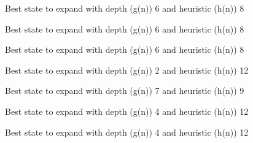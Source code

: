 \documentclass{article}
\begin{document}
{\noindent Best state to expand with depth (g(n)) 6 and heuristic (h(n)) 8\newline}
{}\newline

{\noindent Best state to expand with depth (g(n)) 6 and heuristic (h(n)) 8\newline}
{}\newline

{\noindent Best state to expand with depth (g(n)) 6 and heuristic (h(n)) 8\newline}
{}\newline

{\noindent Best state to expand with depth (g(n)) 2 and heuristic (h(n)) 12\newline}
{}\newline

{\noindent Best state to expand with depth (g(n)) 7 and heuristic (h(n)) 9\newline}
{}\newline

{\noindent Best state to expand with depth (g(n)) 4 and heuristic (h(n)) 12\newline}
{}\newline

{\noindent Best state to expand with depth (g(n)) 4 and heuristic (h(n)) 12\newline}
{}\newline
\end{document}
